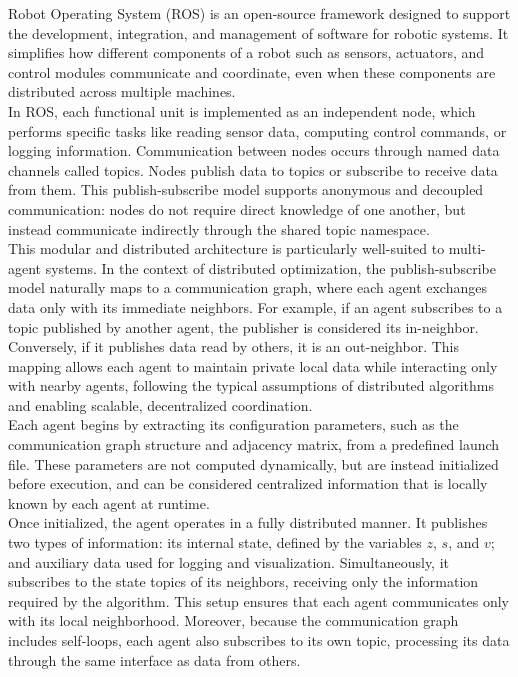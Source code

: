 Robot Operating System (ROS) is an open-source framework designed to support the development, integration, and management of software for robotic systems. It simplifies how different components of a robot such as sensors, actuators, and control modules communicate and coordinate, even when these components are distributed across multiple machines. \\
In ROS, each functional unit is implemented as an independent node, which performs specific tasks like reading sensor data, computing control commands, or logging information. Communication between nodes occurs through named data channels called topics. Nodes publish data to topics or subscribe to receive data from them. This publish-subscribe model supports anonymous and decoupled communication: nodes do not require direct knowledge of one another, but instead communicate indirectly through the shared topic namespace. \\
This modular and distributed architecture is particularly well-suited to multi-agent systems. In the context of distributed optimization, the publish-subscribe model naturally maps to a communication graph, where each agent exchanges data only with its immediate neighbors. For example, if an agent subscribes to a topic published by another agent, the publisher is considered its in-neighbor. Conversely, if it publishes data read by others, it is an out-neighbor. This mapping allows each agent to maintain private local data while interacting only with nearby agents, following the typical assumptions of distributed algorithms and enabling scalable, decentralized coordination. \\
Each agent begins by extracting its configuration parameters, such as the communication graph structure and adjacency matrix, from a predefined launch file. These parameters are not computed dynamically, but are instead initialized before execution, and can be considered centralized information that is locally known by each agent at runtime. \\
Once initialized, the agent operates in a fully distributed manner. It publishes two types of information: its internal state, defined by the variables \( z \), \( s \), and \( v \); and auxiliary data used for logging and visualization. Simultaneously, it subscribes to the state topics of its neighbors, receiving only the information required by the algorithm. This setup ensures that each agent communicates only with its local neighborhood. Moreover, because the communication graph includes self-loops, each agent also subscribes to its own topic, processing its data through the same interface as data from others. \\
